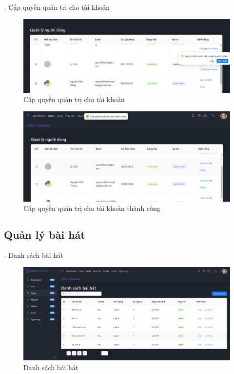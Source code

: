 - Cấp quyền quản trị cho tài khoản
\begin{figure}[H]
    \centering
    \includegraphics[width=1\textwidth]{imgs/chap5/ql_nguoi_dung_5.png}
    \caption{Cấp quyền quản trị cho tài khoản}
\end{figure}
\begin{figure}[H]
    \centering
    \includegraphics[width=1\textwidth]{imgs/chap5/ql_nguoi_dung_6.png}
    \caption{Cấp quyền quản trị cho tài khoản thành công}
\end{figure}

\subsection{Quản lý bài hát}
- Danh sách bài hát
\begin{figure}[H]
    \centering
    \includegraphics[width=1\textwidth]{imgs/chap5/ql_bai_hat_1.png}
    \caption{Danh sách bài hát}
\end{figure}

